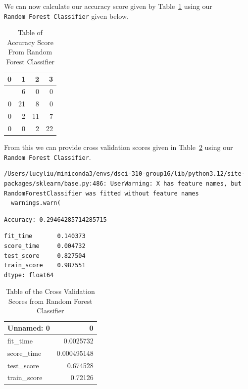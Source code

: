 \documentclass[
  letterpaper,
  DIV=11,
  numbers=noendperiod]{scrartcl}
\begin{document}
We can now calculate our accuracy score given by
Table~\ref{tbl-accuracy-score} using our
\texttt{Random\ Forest\ Classifier} given below.

\begin{longtable}[]{@{}rrrr@{}}

\caption{\label{tbl-accuracy-score}Table of Accuracy Score From Random
Forest Classifier}

\tabularnewline

\toprule\noalign{}
0 & 1 & 2 & 3 \\
\midrule\noalign{}
\endhead
\bottomrule\noalign{}
\endlastfoot
0 & 6 & 0 & 0 \\
0 & 21 & 8 & 0 \\
0 & 2 & 11 & 7 \\
0 & 0 & 2 & 22 \\

\end{longtable}

From this we can provide cross validation scores given in
Table~\ref{tbl-rfc-cross-validate} using our
\texttt{Random\ Forest\ Classifier}.

\begin{verbatim}
/Users/lucyliu/miniconda3/envs/dsci-310-group16/lib/python3.12/site-packages/sklearn/base.py:486: UserWarning: X has feature names, but RandomForestClassifier was fitted without feature names
  warnings.warn(
\end{verbatim}

\begin{verbatim}
Accuracy: 0.29464285714285715
\end{verbatim}

\begin{verbatim}
fit_time       0.140373
score_time     0.004732
test_score     0.827504
train_score    0.987551
dtype: float64
\end{verbatim}

\begin{longtable}[]{@{}lr@{}}

\caption{\label{tbl-rfc-cross-validate}Table of the Cross Validation
Scores from Random Forest Classifier}

\tabularnewline

\toprule\noalign{}
Unnamed: 0 & 0 \\
\midrule\noalign{}
\endhead
\bottomrule\noalign{}
\endlastfoot
fit\_time & 0.0025732 \\
score\_time & 0.000495148 \\
test\_score & 0.674528 \\
train\_score & 0.72126 \\

\end{longtable}
\end{document}

